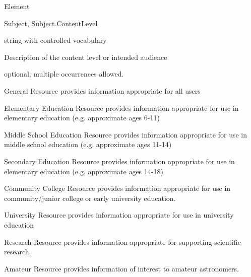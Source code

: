 \documentclass[11pt,a4paper]{ivoa}
\begin{document}
\begin{bigdescription}
\begin{description}
\begin{longtermsdescription}
\end{longtermsdescription}

\end{description}
\item[Element \xmlel{contentLevel}]
\begin{description}
Subject, Subject.ContentLevel
\item[Type] string with controlled vocabulary
\item[Meaning] 
                Description of the content level or intended audience
             
\item[Occurrence] optional; multiple occurrences allowed.

\item[Allowed Values]\hfil
\begin{longtermsdescription}
\item[General]
               Resource provides information appropriate for all users
             
\item[Elementary Education]
               Resource provides information appropriate for use in elementary
               education (e.g. approximate ages 6-11)
             
\item[Middle School Education]
               Resource provides information appropriate for use in middle
               school education (e.g. approximate ages 11-14)
             
\item[Secondary Education]
               Resource provides information appropriate for use in elementary
               education (e.g. approximate ages 14-18)
             
\item[Community College]
               Resource provides information appropriate for use in 
               community/junior college or early university education.
             
\item[University]
               Resource provides information appropriate for use in
               university education
             
\item[Research]
               Resource provides information appropriate for
               supporting scientific research.
             
\item[Amateur]
               Resource provides information of interest to
               amateur astronomers.
             

\end{longtermsdescription}
\end{description}
\end{bigdescription}
\end{document}
